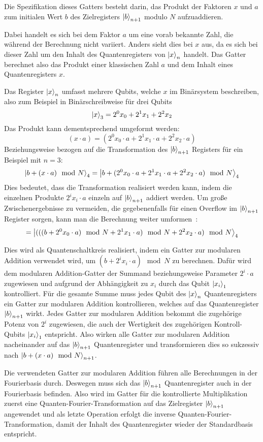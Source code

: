 Die Spezifikation dieses Gatters besteht darin, 
das Produkt der Faktoren \(x\) und \(a\) 
zum initialen Wert \(b\) des Zielregisters \(\ket{b}_{n+1}\) modulo \(N\) aufzuaddieren.

Dabei handelt es sich bei dem Faktor \(a\) um eine vorab bekannte Zahl, 
die während der Berechnung nicht variiert.
Anders sieht dies bei \(x\) aus, da es sich bei dieser Zahl um den Inhalt des Quantenregisters von \(\ket{x}_{n}\) handelt.
Das Gatter berechnet also das Produkt einer klassischen Zahl \(a\) und dem Inhalt eines Quantenregisters \(x\).

Das Register \(\ket{x}_{n}\) umfasst mehrere Qubits, 
welche \(x\) im Binärsystem beschreiben, 
also zum Beispiel in Binärschreibweise für drei Qubits 
\[\ket{x}_{3} = 2^0x_0+2^1x_1+2^2x_2\]
Das Produkt kann dementsprechend umgeformt werden: 
\[(x\cdot a)  = (2^0x_0\cdot a+2^1x_1\cdot a+2^2x_2\cdot a) \]
Beziehungsweise bezogen auf die Transformation des \(\ket{b}_{n+1}\) Registers für ein Beispiel mit \(n=3\):
\[\ket{b + (x\cdot a) \mod N}_{4} = \ket{b + (2^0x_0\cdot a+2^1x_1\cdot a+2^2x_2\cdot a) \mod N}_{4}\]
Dies bedeutet, dass die Transformation realisiert werden kann, 
indem die einzelnen Produkte \(2^ix_i\cdot a\) einzeln auf \(\ket{b}_{n+1}\) addiert werden.
Um große Zwischenergebnisse zu vermeiden, die gegebenenfalls für einen Overflow im \(\ket{b}_{n+1}\) Register sorgen, 
kann man die Berechnung weiter umformen~\cite{beauregard2003circuit}:
\[= \ket{(((b + 2^0x_0\cdot a)\mod N+2^1x_1\cdot a)\mod N+2^2x_2\cdot a) \mod N}_{4}\]

Dies wird als Quantenschaltkreis realisiert, 
indem ein Gatter zur modularen Addition verwendet wird, 
um \((b + 2^ix_i\cdot a)\mod N\) zu berechnen.
Dafür wird dem modularen Addition-Gatter der Summand beziehungsweise Parameter \(2^i\cdot a\) zugewiesen 
und aufgrund der Abhängigkeit zu \(x_i\) durch das Qubit \(\ket{x_i}_1\) kontrolliert.
Für die gesamte Summe muss jedes Qubit des \(\ket{x}_{n}\) Quantenregisters ein Gatter zur modularen Addition kontrollieren, 
welches auf das Quantenregister \(\ket{b}_{n+1}\) wirkt.
Jedes Gatter zur modularen Addition bekommt die zugehörige Potenz von \(2^i\) zugewiesen, 
die auch der Wertigkeit des zugehörigen Kontroll-Qubits \(\ket{x_i}_1\) entspricht.
Also wirken alle Gatter zur modularen Addition nacheinander auf das \(\ket{b}_{n+1}\) Quantenregister und 
transformieren dies so sukzessiv nach \(\ket{b + (x\cdot a) \mod N}_{n+1}\).

Die verwendeten Gatter zur modularen Addition führen alle Berechnungen in der Fourierbasis durch.
Deswegen muss sich das \(\ket{b}_{n+1}\) Quantenregister auch in der Fourierbasis befinden.
Also wird im Gatter für die kontrollierte Multiplikation zuerst eine Quanten-Fourier-Transformation auf das Zielregister \(\ket{b}_{n+1}\) angewendet und 
als letzte Operation erfolgt die inverse Quanten-Fourier-Transformation, 
damit der Inhalt des Quantenregister wieder der Standardbasis entspricht.

